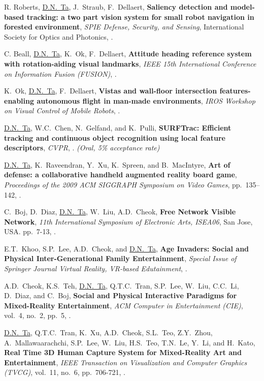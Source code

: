 \documentclass[letterpaper,MMMyyyy,nonstopmode]{simpleresumecv}
\begin{document}
\begin{Body}
\Gap
\NumberedItem{[12]}
{ R. Roberts, \underline{D.N.~Ta}, J.~Straub, F.~Dellaert,
\textbf{Saliency detection and model-based tracking: a two part vision system for small robot navigation in forested environment},
\textit{SPIE Defense, Security, and Sensing},
International Society for Optics and Photonics,
.}

\Gap
\NumberedItem{[11]}
{ C. Beall, \underline{D.N.~Ta}, K.~Ok, F.~Dellaert,
\textbf{Attitude heading reference system with rotation-aiding visual landmarks},
\textit{IEEE 15th International Conference on Information Fusion (FUSION)},
.}


\Gap
\NumberedItem{[10]}
{ K.~Ok, \underline{D.N.~Ta}, F.~Dellaert,
\textbf{Vistas and wall-floor intersection features-enabling autonomous flight in man-made environments},
\textit{IROS Workshop on Visual Control of Mobile Robots},
.}


\Gap
\NumberedItem{[9]}
{ \underline{D.N.~Ta}, W.C.~Chen, N.~Gelfand, and K.~Pulli,
\textbf{SURFTrac: Efficient tracking and continuous object recognition using local feature descriptors},
\textit{CVPR},
. \textit{(Oral, 5\% acceptance rate)}}

\Gap
\NumberedItem{[8]}
{ \underline{D.N.~Ta}, K.~Raveendran, Y.~Xu, K.~Spreen, and B.~MacIntyre,
\textbf{Art of defense: a collaborative handheld augmented reality board game},
\textit{Proceedings of the 2009 ACM SIGGRAPH Symposium on Video Games},
pp.~135–142,
.}

\Gap
\NumberedItem{[7]}
{  C.~Boj, D.~Diaz, \underline{D.N.~Ta}, W.~Liu, A.D.~Cheok,
\textbf{Free Network Visible Network},
\textit{11th International Symposium of Electronic Arts, ISEA06},
San Jose, USA.
pp.~7-13,
.}


\Gap
\NumberedItem{[6]}
{E.T.~Khoo, S.P.~Lee, A.D.~Cheok, and \underline{D.N.~Ta},
\textbf{Age Invaders: Social and Physical Inter-Generational Family Entertainment},
\textit{Special Issue of Springer Journal Virtual Reality, VR-based Edutainment},
.}


\Gap
\NumberedItem{[5]}
{A.D.~Cheok, K.S.~Teh, \underline{D.N.~Ta}, Q.T.C.~Tran, S.P.~Lee, W.~Liu, C.C.~Li, D.~Diaz, and C.~Boj,
\textbf{Social and Physical Interactive Paradigms for Mixed-Reality Entertainment},
\textit{ACM Computer in Entertainment (CIE)},
vol.~4,
no.~2,
pp.~5,
.}

\Gap
\NumberedItem{[4]}
{\underline{D.N.~Ta},  Q.T.C.~Tran, K.~Xu, A.D.~Cheok, S.L.~Teo, Z.Y.~Zhou, A.~Mallawaarachchi, S.P.~Lee, W.~Liu, H.S.~Teo, T.N.~Le, Y.~Li, and H.~Kato,
\textbf{Real Time 3D Human Capture System for Mixed-Reality Art and Entertainment},
\textit{IEEE Transaction on Visualization and Computer Graphics (TVCG)},
vol.~11,
no.~6,
pp.~706-721,
.}


\end{Body}
\end{document}

